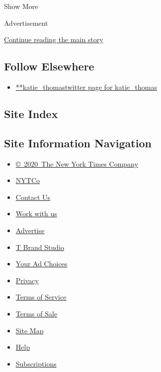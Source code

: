 Show More

Advertisement

\protect\hyperlink{after-mid2}{Continue reading the main story}

\hypertarget{follow-elsewhere}{%
\subsection{Follow Elsewhere}\label{follow-elsewhere}}

\begin{itemize}
\tightlist
\item
  \href{https://twitter.com/katie_thomas}{**katie\_thomastwitter page
  for katie\_thomas}
\end{itemize}

\hypertarget{site-index}{%
\subsection{Site Index}\label{site-index}}

\hypertarget{site-information-navigation}{%
\subsection{Site Information
Navigation}\label{site-information-navigation}}

\begin{itemize}
\tightlist
\item
  \href{https://help.nytimes.com/hc/en-us/articles/115014792127-Copyright-notice}{©~2020~The
  New York Times Company}
\end{itemize}

\begin{itemize}
\tightlist
\item
  \href{https://www.nytco.com/}{NYTCo}
\item
  \href{https://help.nytimes.com/hc/en-us/articles/115015385887-Contact-Us}{Contact
  Us}
\item
  \href{https://www.nytco.com/careers/}{Work with us}
\item
  \href{https://nytmediakit.com/}{Advertise}
\item
  \href{http://www.tbrandstudio.com/}{T Brand Studio}
\item
  \href{https://www.nytimes.com/privacy/cookie-policy\#how-do-i-manage-trackers}{Your
  Ad Choices}
\item
  \href{https://www.nytimes.com/privacy}{Privacy}
\item
  \href{https://help.nytimes.com/hc/en-us/articles/115014893428-Terms-of-service}{Terms
  of Service}
\item
  \href{https://help.nytimes.com/hc/en-us/articles/115014893968-Terms-of-sale}{Terms
  of Sale}
\item
  \href{https://spiderbites.nytimes.com}{Site Map}
\item
  \href{https://help.nytimes.com/hc/en-us}{Help}
\item
  \href{https://www.nytimes.com/subscription?campaignId=37WXW}{Subscriptions}
\end{itemize}
